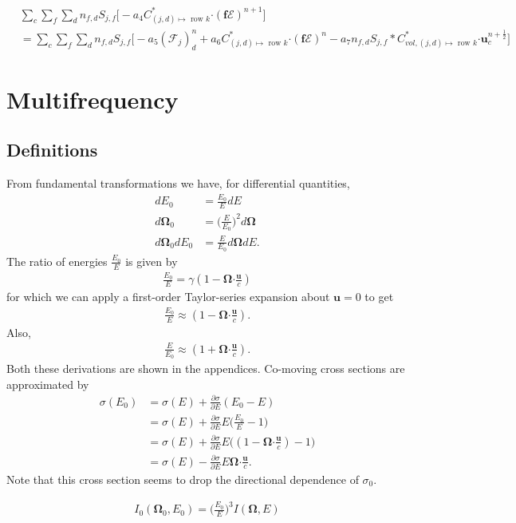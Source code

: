 \documentclass[10pt,letterpaper,notitlepage]{article}
\numberwithin{equation}{section}
\newcommand{\partialderiv}[2]{\frac{\partial #1}{\partial #2}}
\newcommand{\Omegabf}{\mathbf{\Omega}}
\newcommand{\velocity}{\mathbf{u}}
\newcommand{\dotp}{\boldsymbol{\cdot}}
\newcommand{\RadE}{\mathcal{E}}
\newcommand{\RadF}{\boldsymbol{\mathcal{F}}}
\newcommand{\half}{\frac{1}{2}}
\newcommand{\beqn}{\begin{equation}\begin{aligned}}
\newcommand{\eeqn}{\end{aligned}\end{equation}}
\begin{document}
\beqn 
&\sum_c \sum_f \sum_d n_{f,d} S_{j,f} \biggr[ -a_4
C^*_{(j,d)\mapsto \text{ row } k} \dotp (\mathbf{f}\boldsymbol{\RadE})^{n+1}
\biggr]\\
&=
\sum_c \sum_f \sum_d n_{f,d} S_{j,f} \biggr[ 
-a_5 (\RadF_j)_d^{n}
+a_6
C^*_{(j,d)\mapsto \text{ row } k} \dotp (\mathbf{f}\boldsymbol{\RadE})^{n}
-a_7
n_{f,d} S_{j,f} * C_{vol,(j,d)\mapsto \text{ row } k}^* \dotp \velocity_c^{n+\half}
\biggr]
\eeqn 



\newpage
\section{Multifrequency}
\subsection{Definitions}
From fundamental transformations we have, for differential quantities, 
\beqn 
dE_0 &= \frac{E_0}{E}dE \\
d\Omegabf_0 &= \biggr( \frac{E}{E_0} \biggr)^2 d\Omegabf \\
d\Omegabf_0 dE_0 &= \frac{E}{E_0} d\Omegabf dE.
\eeqn 
The ratio of energies $\frac{E_0}{E}$ is given by
\beqn 
\frac{E_0}{E} = \gamma (1-\Omegabf\dotp \frac{\velocity}{c})
\eeqn 
for which we can apply a first-order Taylor-series expansion about $\velocity=0$ to get
\beqn 
\frac{E_0}{E} \approx (1-\Omegabf\dotp \frac{\velocity}{c}).
\eeqn 
Also,
\beqn 
\frac{E}{E_0} \approx (1+\Omegabf\dotp \frac{\velocity}{c}).
\eeqn 
Both these derivations are shown in the appendices.
Co-moving cross sections are approximated by
\beqn 
\sigma(E_0) &= \sigma(E) + \partialderiv{\sigma}{E}(E_0-E) \\
&= \sigma(E) + \partialderiv{\sigma}{E}E\biggr(\frac{E_0}{E}-1\biggr) \\
&= \sigma(E) + \partialderiv{\sigma}{E}E\biggr((1-\Omegabf\dotp\frac{\velocity}{c})-1\biggr) \\
&= \sigma(E) - \partialderiv{\sigma}{E}E \Omegabf \dotp \frac{\velocity}{c}.
\eeqn 
Note that this cross section seems to drop the directional dependence of $\sigma_0$.


\beqn \label{eq:intensity_CF_vs_LF}
I_0(\Omegabf_0, E_0) = \biggr( \frac{E_0}{E} \biggr)^3 I(\Omegabf, E)
\eeqn 
\end{document}
